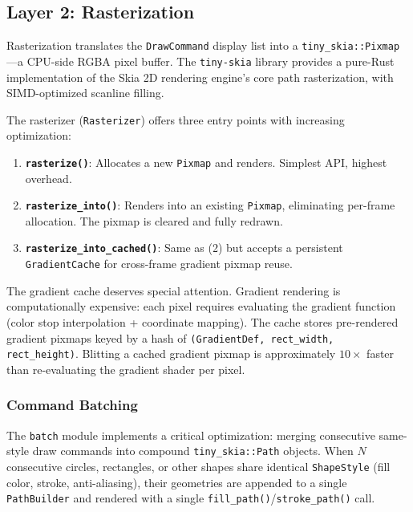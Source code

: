 \documentclass[11pt, a4paper, twocolumn]{article}
\begin{document}
\subsection{Layer 2: Rasterization}

Rasterization translates the \texttt{DrawCommand} display list into a \texttt{tiny\_skia::Pixmap}---a CPU-side RGBA pixel buffer.
The \texttt{tiny-skia} library provides a pure-Rust implementation of the Skia 2D rendering engine's core path rasterization, with SIMD-optimized scanline filling.

The rasterizer (\texttt{Rasterizer}) offers three entry points with increasing optimization:

\begin{enumerate}[leftmargin=1.5em, itemsep=0.1em]
    \item \textbf{\texttt{rasterize()}}: Allocates a new \texttt{Pixmap} and renders. Simplest API, highest overhead.
    \item \textbf{\texttt{rasterize\_into()}}: Renders into an existing \texttt{Pixmap}, eliminating per-frame allocation. The pixmap is cleared and fully redrawn.
    \item \textbf{\texttt{rasterize\_into\_cached()}}: Same as (2) but accepts a persistent \texttt{GradientCache} for cross-frame gradient pixmap reuse.
\end{enumerate}

The gradient cache deserves special attention.
Gradient rendering is computationally expensive: each pixel requires evaluating the gradient function (color stop interpolation + coordinate mapping).
The cache stores pre-rendered gradient pixmaps keyed by a hash of \texttt{(GradientDef, rect\_width, rect\_height)}.
Blitting a cached gradient pixmap is approximately $10\times$ faster than re-evaluating the gradient shader per pixel.

\subsubsection{Command Batching}

The \texttt{batch} module implements a critical optimization: merging consecutive same-style draw commands into compound \texttt{tiny\_skia::Path} objects.
When $N$ consecutive circles, rectangles, or other shapes share identical \texttt{ShapeStyle} (fill color, stroke, anti-aliasing), their geometries are appended to a single \texttt{PathBuilder} and rendered with a single \texttt{fill\_path()}/\texttt{stroke\_path()} call.
\end{document}
